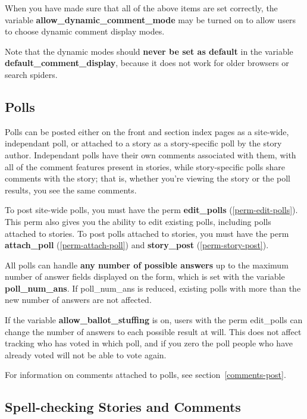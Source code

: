 When you have made sure that all of the above items are set correctly, the variable {\bf allow\_dynamic\_comment\_mode} may be turned on to allow users to choose dynamic comment display modes.

Note that the dynamic modes should {\bf never be set as default} in the variable {\bf default\_comment\_display}, because it does not work for older browsers or search spiders.

\subsection{Polls}
\label{features-polls}

Polls can be posted either on the front and section index pages as a site-wide, independant poll, or attached to a story as a story-specific poll by the story author.  Independant polls have their own comments associated with them, with all of the comment features present in stories, while story-specific polls share comments with the story; that is, whether you're viewing the story or the poll results, you see the same comments.

To post site-wide polls, you must have the perm {\bf edit\_polls} (\ref{perm-edit-polls}).  This perm also gives you the ability to edit existing polls, including polls attached to stories.  To post polls attached to stories, you must have the perm {\bf attach\_poll} (\ref{perm-attach-poll}) and {\bf story\_post} (\ref{perm-story-post}).

All polls can handle {\bf any number of possible answers} up to the maximum number of answer fields displayed on the form, which is set with the variable {\bf poll\_num\_ans}.  If poll\_num\_ans is reduced, existing polls with more than the new number of answers are not affected.

If the variable {\bf allow\_ballot\_stuffing} is on, users with the perm edit\_polls can change the number of answers to each possible result at will.  This does not affect tracking who has voted in which poll, and if you zero the poll people who have already voted will not be able to vote again.

For information on comments attached to polls, see section~\ref{comments-post}.

\subsection{Spell-checking Stories and Comments}
\label{features-spellcheck}

